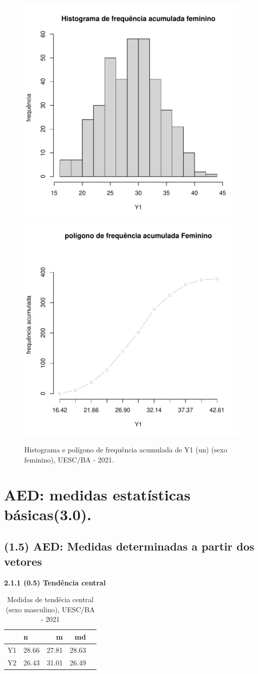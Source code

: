 \documentclass[12pt]{article}\usepackage[]{graphicx}\usepackage[]{color}
\newenvironment{knitrout}{}{} %
\begin{document}
\begin{figure}[!h]
\label{figura:Histograma-Poligono-F}
\begin{knitrout}
\color{fgcolor}

{\centering \includegraphics[width=.4\linewidth]{figure/minimal-Histograma-Poligono-Fem-1} 
\includegraphics[width=.4\linewidth]{figure/minimal-Histograma-Poligono-Fem-2} \caption{Histograma e polígono de frequência acumulada de Y1 (un) (sexo feminino), UESC/BA - 2021.}
}


\end{knitrout}
\end{figure}
\pagebreak

\section{AED: medidas estatísticas básicas(3.0).}

    \subsection{(1.5) AED: Medidas determinadas a partir dos vetores}
    
    \textbf{ 2.1.1 (0.5) Tendência central}


\begin{table}[!ht]
  \centering
  \caption{Medidas de tendêcia central (sexo masculino), UESC/BA - 2021}
  \begin{tabular}{rlrrr} 
    \toprule
    & n & m & md \\ 
    \midrule
  Y1 & 28.66 & 27.81 & 28.63 \\ 
  Y2 & 26.43 & 31.01 & 26.49 \\ 
     \bottomrule
  \end{tabular}
\end{table}
\end{document}
